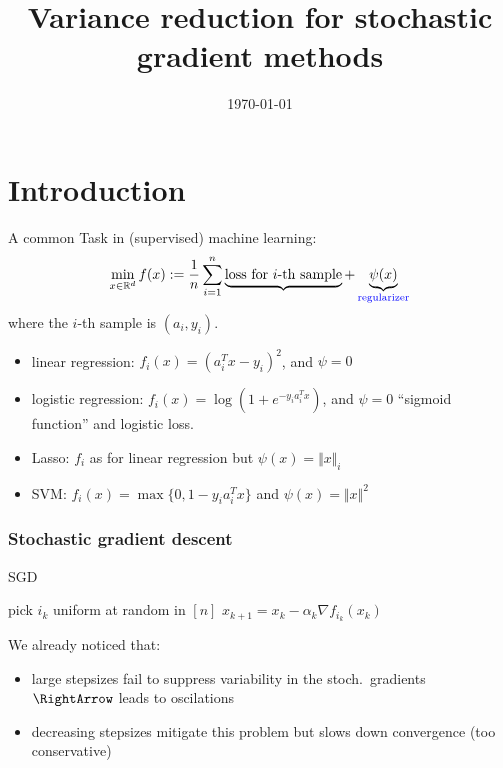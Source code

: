 \documentclass{beamer}
\title{Variance reduction for stochastic gradient methods}
\date{\today}
\begin{document}
\maketitle
\frame{\tableofcontents[currentsection]}

\section{Introduction}%


A common Task in (supervised) machine learning:
\begin{equation}
  \min_{x\in \mathbb{R}^d} f(x) := \frac{1}{n} \sum_{i=1}^{n} \underbrace{\text{loss for $i$-th sample}} + \underbrace{\psi(x)}_{\textcolor{blue}{\text{regularizer}}}
\end{equation}
where the $i$-th sample is $(a_i, y_i)$.

\begin{itemize}
  \item linear regression: $f_i(x) = {(a_i^T x -y_i)}^2$, and $\psi=0$
  \item logistic regression: $f_i(x) = \log(1+e^{-y_i a_i^T x})$, and $\psi=0$
        ``sigmoid function'' and logistic loss.
  \item Lasso: $f_i$ as for linear regression but $\psi(x) = \Vert x \Vert_i$
  \item SVM: $f_i(x) = \max \{0 , 1 - y_i a_i^T x\}$ and $\psi(x)= \Vert x \Vert^2$
\end{itemize}


\begin{frame}
  \frametitle{Stochastic gradient descent}
  \begin{algorithm}[H]
    \caption{SGD}\label{euclid}
    \begin{algorithmic}[1]
      \State pick $i_k$ uniform at random in $[n]$
      \State $x_{k+1} = x_k  - \alpha_k \nabla f_{i_k}(x_k)$
      \Endfor
    \end{algorithmic}
  \end{algorithm}

  We already noticed that:
  \begin{itemize}
    \item large stepsizes fail to suppress variability in the stoch.\ gradients $\RightArrow$ leads to oscilations
    \item decreasing stepsizes mitigate this problem but slows down convergence (too conservative)
  \end{itemize}

\end{frame}
\end{document}
